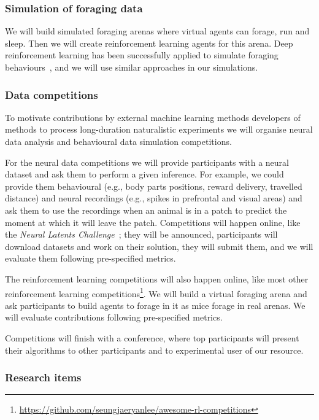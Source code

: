\subsubsection{Simulation of foraging data}

We will build simulated foraging arenas where virtual agents can forage, run
and sleep. Then we will create reinforcement learning agents for this arena.
Deep reinforcement learning has been successfully applied to simulate foraging
behaviours~\citep{wispinskiEtAl22}, and we will use similar approaches in our
simulations.

\subsubsection{Data competitions}

To motivate contributions by external machine learning methods developers of
methods to process long-duration naturalistic experiments we will organise
neural data analysis and behavioural data simulation competitions.

For the neural data competitions we will provide participants with a neural
dataset and ask them to perform a given inference. For example, we could
provide them behavioural (e.g., body parts positions, reward delivery, travelled
distance) and neural recordings (e.g., spikes in prefrontal and visual areas)
and ask them to use the recordings when an animal is in a patch to predict the
moment at which it will leave the patch. Competitions will happen online, like
the \emph{Neural Latents Challenge}~\citep{peiEtAl22}; they will be announced,
participants will download datasets and work on their solution, they will
submit them, and we will evaluate them following pre-specified metrics.

The reinforcement learning competitions will also happen online, like most
other reinforcement learning
competitions\footnote{\url{https://github.com/seungjaeryanlee/awesome-rl-competitions}}.
We will build a virtual foraging arena and ask participants to build agents to
forage in it as mice forage in real arenas. We will evaluate contributions
following pre-specified metrics.

Competitions will finish with a conference, where top participants will present
their algorithms to other participants and to experimental user of our
resource.

\subsubsection{Research items}
\label{sec:research}

